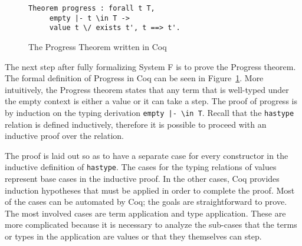 \documentclass{sig-alternate}
\begin{document}
\begin{figure}
\begin{lstlisting}
Theorem progress : forall t T, 
     empty |- t \in T ->
     value t \/ exists t', t ==> t'.
\end{lstlisting}
\caption{The Progress Theorem written in Coq}
\label{fig:progress-coq}
\end{figure}

The next step after fully formalizing System F is to prove the Progress theorem. The formal definition of Progress in Coq can be seen in Figure~\ref{fig:progress-coq}. More intuitively, the Progress theorem states that any term that is well-typed under the empty context is either a value or it can take a step. The proof of progress is by induction on the typing derivation \texttt{empty |- \textbackslash in T}. Recall that the \texttt{has\textunderscore type} relation is defined inductively, therefore it is possible to proceed with an inductive proof over the relation.

The proof is laid out so as to have a separate case for every constructor in the inductive definition of \texttt{has\textunderscore type}. The cases for the typing relations of values represent base cases in the inductive proof. In the other cases, Coq provides induction hypotheses that must be applied in order to complete the proof. Most of the cases can be automated by Coq; the goals are straightforward to prove. The most involved cases are term application and type application. These are more complicated because it is necessary to analyze the sub-cases that the terms or types in the application are values or that they themselves can step.
\end{document}
